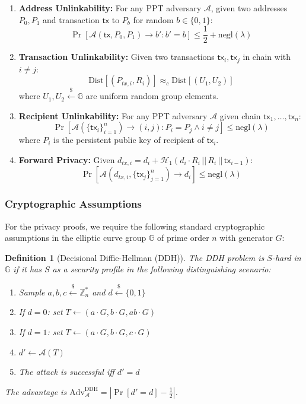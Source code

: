 \documentclass{article}
\newtheorem{definition}{Definition}[section]
\begin{document}
\begin{enumerate}
\item \textbf{Address Unlinkability:}
For any PPT adversary $\mathcal{A}$, given two addresses $P_0, P_1$ and transaction $\mathsf{tx}$ to $P_b$ for random $b \in \{0,1\}$:
$$\Pr\left[\mathcal{A}(\mathsf{tx}, P_0, P_1) \rightarrow b' : b' = b\right] \leq \frac{1}{2} + \text{negl}(\lambda)$$

\item \textbf{Transaction Unlinkability:}
Given two transactions $\mathsf{tx}_i, \mathsf{tx}_j$ in chain with $i \neq j$:
$$\text{Dist}[(P_{tx,i}, R_i)] \approx_c \text{Dist}[(U_1, U_2)]$$
where $U_1, U_2 \stackrel{\$}{\leftarrow} \mathbb{G}$ are uniform random group elements.

\item \textbf{Recipient Unlinkability:}
For any PPT adversary $\mathcal{A}$ given chain $\mathsf{tx}_1, \ldots, \mathsf{tx}_n$:
$$\Pr\left[\mathcal{A}(\{\mathsf{tx}_i\}_{i=1}^n) \rightarrow (i,j) : P_i = P_j \wedge i \neq j\right] \leq \text{negl}(\lambda)$$
where $P_i$ is the persistent public key of recipient of $\mathsf{tx}_i$.

\item \textbf{Forward Privacy:}
Given $d_{tx,i} = d_i + \mathcal{H}_1(d_i \cdot R_i \,||\, R_i \,||\, \mathsf{tx}_{i-1})$:
$$\Pr\left[\mathcal{A}(d_{tx,i}, \{\mathsf{tx}_j\}_{j=1}^n) \rightarrow d_i\right] \leq \text{negl}(\lambda)$$
\end{enumerate}

\subsubsection{Cryptographic Assumptions}

For the privacy proofs, we require the following standard cryptographic assumptions in the elliptic curve group $\mathbb{G}$ of prime order $n$ with generator $G$:

\begin{definition}[Decisional Diffie-Hellman (DDH)]
The DDH problem is $S$-hard in $\mathbb{G}$ if it has $S$ as a security profile in the following distinguishing scenario:
\begin{enumerate}
\item Sample $a, b, c \stackrel{\$}{\leftarrow} \mathbb{Z}_n^*$ and $d \stackrel{\$}{\leftarrow} \{0,1\}$
\item If $d = 0$: set $T \leftarrow (a \cdot G, b \cdot G, ab \cdot G)$
\item If $d = 1$: set $T \leftarrow (a \cdot G, b \cdot G, c \cdot G)$
\item $d' \gets \mathcal{A}(T)$
\item The attack is successful iff $d' = d$
\end{enumerate}
The advantage is $\text{Adv}^{\text{DDH}}_{\mathcal{A}} = \left|\Pr[d' = d] - \frac{1}{2}\right|$.
\end{definition}
\end{document}
